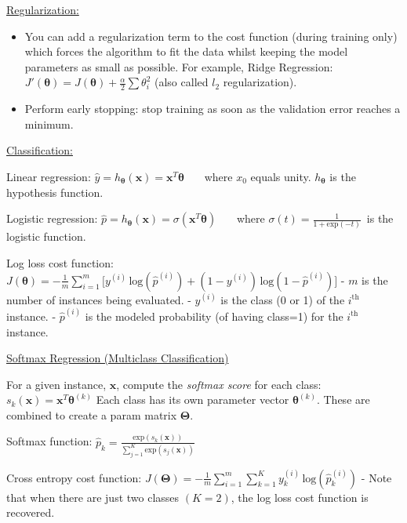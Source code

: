 \underline{Regularization:}
\vspace{-3.0mm}
\begin{itemize}
\item
You can add a regularization term to the cost function (during training only)
which forces the algorithm to fit the data whilst keeping the model parameters as small as possible.\newline
For example, Ridge Regression:
$J'(\boldsymbol{\theta}) = J (\boldsymbol{\theta}) + \frac{\alpha}{2}\sum \theta_i^2$
(also called $l_2$ regularization).
\item
Perform early stopping: stop training as soon as the validation error reaches a minimum.
\end{itemize}

\underline{Classification:}

Linear regression:
$\hat{y} = h_{\boldsymbol{\theta}}(\boldsymbol{x}) = \boldsymbol{x}^{T} \boldsymbol{\theta}$
~~~where $x_0$ equals unity. $h_{\boldsymbol{\theta}}$ is the hypothesis function.

Logistic regression:
$\hat{p} = h_{\boldsymbol{\theta}}(\boldsymbol{x}) = \sigma({\boldsymbol{x}^{T} \boldsymbol{\theta}})$
~~~where $\sigma(t) = \frac{1}{1+\textrm{exp}(-t)}$~is the logistic function.

Log loss cost function:
$J(\boldsymbol{\theta}) = - \frac{1}{m} \sum_{i=1}^{m} \big[ y^{(i)} \, \textrm{log}(\hat{p}^{(i)}) + (1 - y^{(i)}) \, \textrm{log}(1 - \hat{p}^{(i)}) \big]$\newline
- $m$ is the number of instances being evaluated.\newline
- $y^{(i)}$ is the class (0 or 1) of the $i^{\textrm{th}}$ instance.\newline
- $\hat{p}^{(i)}$ is the modeled probability (of having class=1) for the $i^{\textrm{th}}$ instance.\newline

\underline{Softmax Regression (Multiclass Classification)}

For a given instance, $\boldsymbol{x}$, compute the \textit{softmax score} for each class:
$s_k(\boldsymbol{x}) = \boldsymbol{x}^T \boldsymbol{\theta}^{(k)}$\newline
Each class has its own parameter vector $\boldsymbol{\theta}^{(k)}$.
These are combined to create a param matrix $\boldsymbol{\Theta}$.

Softmax function:
$\hat{p}_k = \frac{\textrm{exp}(s_k(\boldsymbol{x}))}{\sum_{j=1}^{K} \textrm{exp}(s_j(\boldsymbol{x}))}$

Cross entropy cost function:
$J(\boldsymbol{\Theta}) = - \frac{1}{m} \sum_{i=1}^{m} \sum_{k=1}^{K} y_k^{(i)}\, \textrm{log}(\hat{p}_k^{(i)})$\newline
- Note that when there are just two classes $(K=2)$, the log loss cost function is recovered.

\newpage